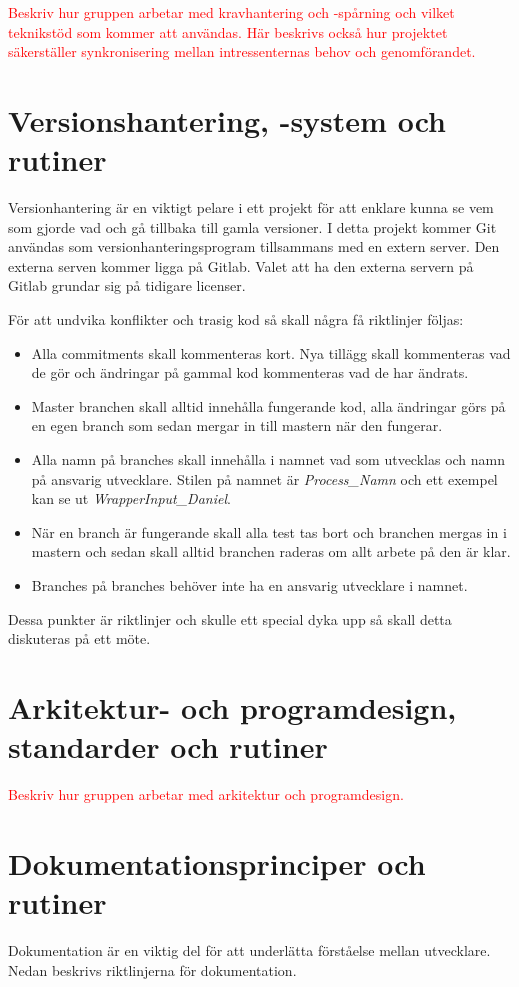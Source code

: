 \documentclass[a4paper,12pt,oneside,final]{extbook}
\begin{document}
\textcolor{red}{Beskriv hur gruppen arbetar med kravhantering och -spårning och vilket teknikstöd som kommer att
användas.}
\textcolor{red}{Här beskrivs också hur projektet säkerställer synkronisering mellan intressenternas behov och genomförandet.}


\section{Versionshantering, -system och rutiner}
Versionhantering är en viktigt pelare i ett projekt för att enklare kunna se vem som gjorde vad och gå tillbaka till gamla versioner. I detta projekt kommer Git användas som versionhanteringsprogram tillsammans med en extern server. Den externa serven kommer ligga på Gitlab. Valet att ha den externa servern på Gitlab grundar sig på tidigare licenser.

För att undvika konflikter och trasig kod så skall några få riktlinjer följas:
\begin{itemize}
	\item Alla commitments skall kommenteras kort. Nya tillägg skall kommenteras vad de gör och ändringar på gammal kod kommenteras vad de har ändrats. 
	\item Master branchen skall alltid innehålla fungerande kod, alla ändringar görs på en egen branch som sedan mergar in till mastern när den fungerar.
	\item Alla namn på branches skall innehålla i namnet vad som utvecklas och namn på ansvarig utvecklare. Stilen på namnet är \textit{Process\_Namn} och ett exempel kan se ut \textit{WrapperInput\_Daniel}.
	\item När en branch är fungerande skall alla test tas bort och branchen mergas in i mastern och sedan skall alltid branchen raderas om allt arbete på den är klar.
	\item Branches på branches behöver inte ha en ansvarig utvecklare i namnet. 
\end{itemize}

Dessa punkter är riktlinjer och skulle ett special dyka upp så skall detta diskuteras på ett möte.


\section{Arkitektur- och programdesign, standarder och rutiner}

\textcolor{red}{Beskriv hur gruppen arbetar med arkitektur och programdesign.}
\section{Dokumentationsprinciper och rutiner}
Dokumentation är en viktig del för att underlätta förståelse mellan utvecklare. Nedan beskrivs riktlinjerna för dokumentation.
\end{document}
